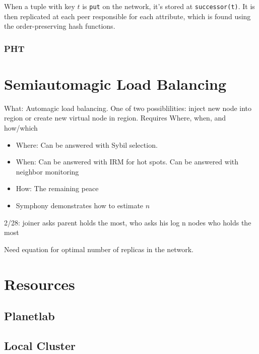 \documentclass[10pt,letterpaper,twoside]{report}
\begin{document}
When a tuple with key $t$ is \texttt{put} on the network, it's stored at \texttt{successor(t)}.  It is then replicated at each peer responsible for each attribute, which is found using the order-preserving hash functions.


\subsubsection*{PHT}


\section{Semiautomagic Load Balancing}
What: Automagic load balancing.  One of two possiblilities:  inject new node into region or create new virtual node in region. 
Requires Where, when, and how/which

\begin{itemize}
    \item Where: Can be answered with Sybil selection.
    \item When:  Can be answered with IRM for hot spots.  Can be answered with neighbor monitoring
    \item How:  The remaining peace
    \item Symphony demonstrates how to estimate $n$
\end{itemize}

2/28: joiner asks parent holds the most, who asks his log n nodes who holds the most


Need equation for optimal number of replicas in the network.

\section{Resources}
\subsection{Planetlab}
\subsection{Local Cluster}





\end{document}
